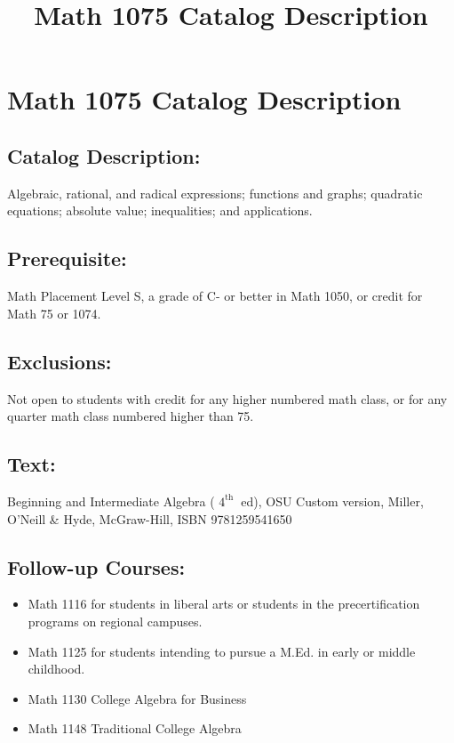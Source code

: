 \documentclass{ximera}
\title{Math 1075 Catalog Description}
\begin{document}
\section*{Math 1075 Catalog Description}
\subsection*{Catalog Description:}
Algebraic, rational, and radical expressions; functions and graphs; quadratic equations; absolute value; inequalities; and applications.

\subsection*{Prerequisite:}
Math Placement Level S, a grade of C- or better in Math 1050, or credit for Math 75 or 1074.

\subsection*{Exclusions:}
Not open to students with credit for any higher numbered math class, or for any quarter math class numbered higher than 75.

\subsection*{Text:}
Beginning and Intermediate Algebra ( $4^{\text {th }}$ ed), OSU Custom version, Miller, O'Neill \& Hyde, McGraw-Hill, ISBN 9781259541650

\subsection*{Follow-up Courses:}
\begin{itemize}
  \item Math 1116 for students in liberal arts or students in the precertification programs on regional campuses.
  \item Math 1125 for students intending to pursue a M.Ed. in early or middle childhood.
  \item Math 1130 College Algebra for Business
  \item Math 1148 Traditional College Algebra
\end{itemize}
\end{document}
